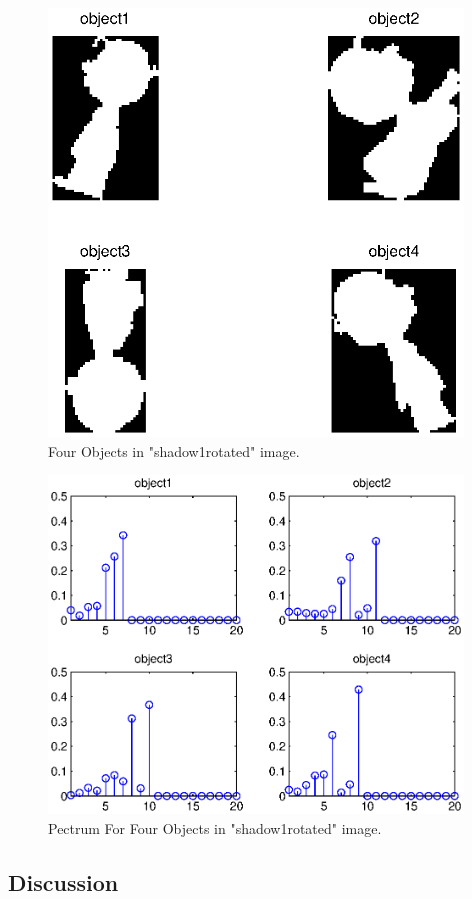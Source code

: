 \documentclass[paper=a4, fontsize=11pt]{scrartcl}
\begin{document}
\begin{figure}
	\centering
	\includegraphics[width=11cm]{4objectinshadowrotated1.eps}
	\caption{ Four Objects in "shadow1rotated" image. }
	\label{fig:27}
\end{figure}

\begin{figure}
	\centering
	\includegraphics[width=11cm]{pecstrum_for_4objectinshadowrotated1.eps}
	\caption{ Pectrum For Four Objects in "shadow1rotated" image. }
	\label{fig:28}
\end{figure}





\subsection{ Discussion }
\end{document}

